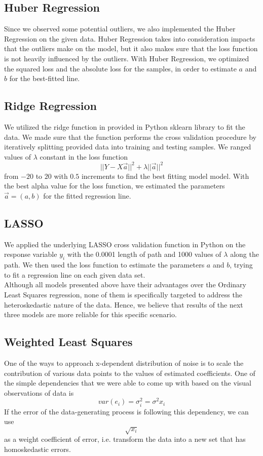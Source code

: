 \documentclass[letter,12pt]{article} %
\begin{document}
	\subsection*{Huber Regression}
	
	Since we observed some potential outliers, we also implemented the Huber Regression on the given data. Huber Regression takes into consideration impacts that the outliers make on the model, but it also makes sure that the loss function is not heavily influenced by the outliers. With Huber Regression, we optimized the squared loss and the absolute loss for the samples, in order to estimate $a$ and $b$ for the best-fitted line.
	
	\subsection*{Ridge Regression}
	
	We utilized the ridge function in provided in Python sklearn library to fit the data. We made sure that the function performs  the cross validation procedure by iteratively splitting provided data into training and testing samples. We ranged  values of $\lambda$ constant in the loss function
	$$
	||Y - X\vec{a}||^2 + \lambda||\vec{a}||^2
	$$ from $-20$ to $20$ with $0.5$ increments to find the best fitting model model. With the best alpha value for the loss function, we estimated the parameters $\vec{a} =  (a,b)$ for the fitted regression line.
	
	\subsection*{LASSO}
	
	We applied the underlying LASSO cross validation function in Python on the response variable $y_i$ with the 0.0001 length of path and 1000 values of $\lambda$ along the path. We then used the loss function to estimate the parameters $a$ and $b$, trying to fit a regression line on each given data set.\\
	
	Although all models presented above have their advantages over the Ordinary Least Squares regression, none of them is specifically targeted to address the heteroskedastic nature of the data. Hence, we believe that results of the next three models are more reliable for this specific scenario.
	
	\subsection*{Weighted Least Squares}
	One of the ways to approach x-dependent distribution of noise is to scale the contribution of various data points to the values of estimated coefficients. One of the simple dependencies that we were able to come up with based on the visual observations of data is 
	$$
	var(e_i) = \sigma^2_i = \sigma^2 x_i
	$$
	If the error of the data-generating process is following this dependency, we can use 
	$$
	\sqrt{x_i}
	$$
	as a weight coefficient of error, i.e. transform the data into a new set that has homoskedastic errors.
	
\end{document}
